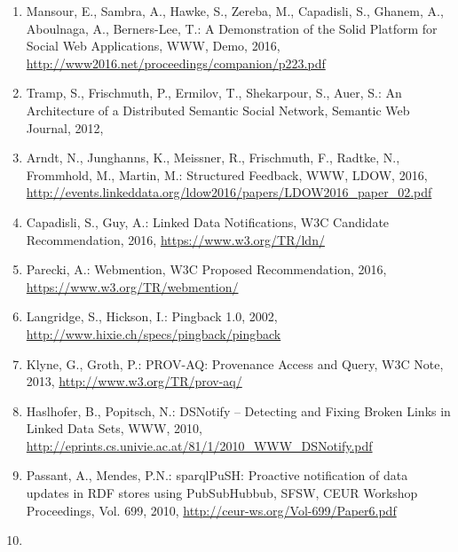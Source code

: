 \documentclass[]{article}
\begin{document}
\begin{enumerate}
\item
  \hypertarget{ref-1}{}

  Mansour, E., Sambra, A., Hawke, S., Zereba, M., Capadisli, S., Ghanem,
  A., Aboulnaga, A., Berners-Lee, T.: A Demonstration of the Solid
  Platform for Social Web Applications, WWW, Demo, 2016,
  \url{http://www2016.net/proceedings/companion/p223.pdf}
\item
  \hypertarget{ref-2}{}

  Tramp, S., Frischmuth, P., Ermilov, T., Shekarpour, S., Auer, S.: An
  Architecture of a Distributed Semantic Social Network, Semantic Web
  Journal, 2012,
  \href{http://www.semantic-web-journal.net/sites/default/files/swj201_4.pdf}{}
\item
  \hypertarget{ref-3}{}

  Arndt, N., Junghanns, K., Meissner, R., Frischmuth, F., Radtke, N.,
  Frommhold, M., Martin, M.: Structured Feedback, WWW, LDOW, 2016,
  \url{http://events.linkeddata.org/ldow2016/papers/LDOW2016_paper_02.pdf}
\item
  \hypertarget{ref-4}{}

  Capadisli, S., Guy, A.: Linked Data Notifications, W3C Candidate
  Recommendation, 2016, \url{https://www.w3.org/TR/ldn/}
\item
  \hypertarget{ref-5}{}

  Parecki, A.: Webmention, W3C Proposed Recommendation, 2016,
  \url{https://www.w3.org/TR/webmention/}
\item
  \hypertarget{ref-6}{}

  Langridge, S., Hickson, I.: Pingback 1.0, 2002,
  \url{http://www.hixie.ch/specs/pingback/pingback}
\item
  \hypertarget{ref-7}{}

  Klyne, G., Groth, P.: PROV-AQ: Provenance Access and Query, W3C Note,
  2013, \url{http://www.w3.org/TR/prov-aq/}
\item
  \hypertarget{ref-8}{}

  Haslhofer, B., Popitsch, N.: DSNotify -- Detecting and Fixing Broken
  Links in Linked Data Sets, WWW, 2010,
  \url{http://eprints.cs.univie.ac.at/81/1/2010_WWW_DSNotify.pdf}
\item
  \hypertarget{ref-9}{}

  Passant, A., Mendes, P.N.: sparqlPuSH: Proactive notification of data
  updates in RDF stores using PubSubHubbub, SFSW, CEUR Workshop
  Proceedings, Vol. 699, 2010,
  \url{http://ceur-ws.org/Vol-699/Paper6.pdf}
\item
  \hypertarget{ref-10}{}


\end{enumerate}
\end{document}
